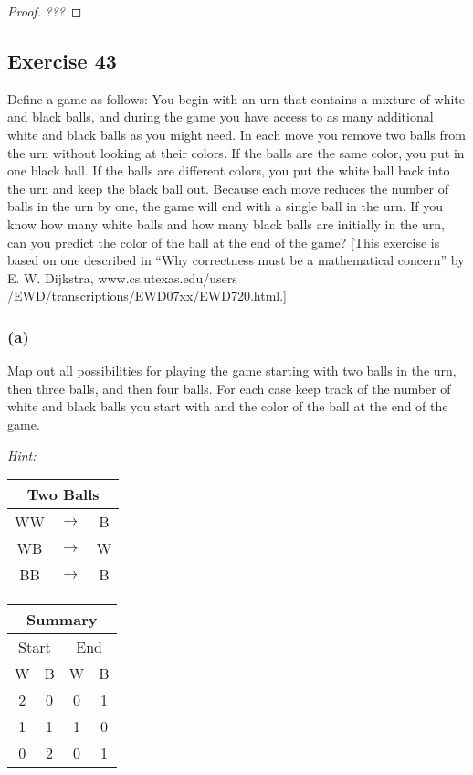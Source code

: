 \documentclass[14pt]{extarticle}
\newcommand{\cy}{\color{cyan}}
\begin{document}
\begin{proof}
    {\it ???}
\end{proof}

\subsection{Exercise 43}
Define a game as follows: You begin with an urn that contains a mixture of white and black balls, and during the game you have access to as many additional white and black balls as you might need. In each move you remove two balls from the urn without looking at their colors. If the balls
are the same color, you put in one black ball. If the balls are different colors, you put the white ball back into the urn and keep the black ball out. Because each move reduces the number of balls in the urn by one, the game will end with a single ball in the urn. If you know how many white balls and how many black balls are initially in the urn, can you predict the color of the ball at the end of the game? [This exercise is based on one described in “Why correctness must be a mathematical concern” by E. W. Dijkstra, www.cs.utexas.edu/users /EWD/transcriptions/EWD07xx/EWD720.html.]

\subsubsection{(a)}
Map out all possibilities for playing the game starting with two balls in the urn, then three balls, and then four balls. For each case keep track of the number of white and black balls you start with and the color of the ball at the
end of the game.

    {\it Hint:}
\begin{tabular}{|ccc|}
    \hline
    \multicolumn{3}{|c|}{\cy Two Balls} \\
    \hline
    WW & $\to$ & B                      \\
    \hline
    WB & $\to$ & W                      \\
    \hline
    BB & $\to$ & B                      \\
    \hline
\end{tabular}
\begin{tabular}{|cc|cc|}
    \hline
    \multicolumn{4}{|c|}{\cy Summary}                              \\
    \hline
    \multicolumn{2}{|c|}{Start} & \multicolumn{2}{c|}{End}         \\
    \hline
    W                           & B                        & W & B \\
    \hline
    2                           & 0                        & 0 & 1 \\
    \hline
    1                           & 1                        & 1 & 0 \\
    \hline
    0                           & 2                        & 0 & 1 \\
    \hline
\end{tabular}
\end{document}
